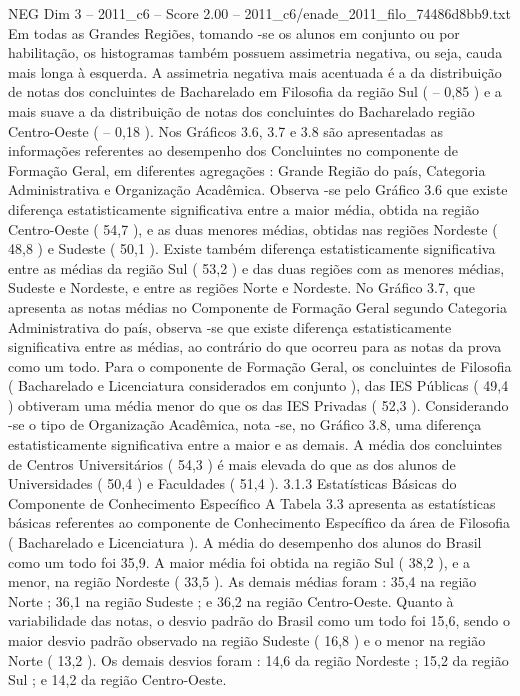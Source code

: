 \begin{textsample}{NEG Dim 3 – 2011\_c6 – Score 2.00 – 2011\_c6/enade\_2011\_filo\_74486d8bb9.txt}
Em todas as Grandes Regiões, tomando -se os alunos em conjunto ou por habilitação, os histogramas também possuem assimetria negativa, ou seja, cauda mais longa à esquerda.
A assimetria negativa mais acentuada é a da distribuição de notas dos concluintes de Bacharelado em Filosofia da região Sul ( – 0,85 ) e a mais suave a da distribuição de notas dos concluintes do Bacharelado região Centro-Oeste ( – 0,18 ).
Nos Gráficos 3.6, 3.7 e 3.8 são apresentadas as informações referentes ao desempenho dos Concluintes no componente de Formação Geral, em diferentes agregações : Grande Região do país, Categoria Administrativa e Organização Acadêmica.
Observa -se pelo Gráfico 3.6 que existe diferença estatisticamente significativa entre a maior média, obtida na região Centro-Oeste ( 54,7 ), e as duas menores médias, obtidas nas regiões Nordeste ( 48,8 ) e Sudeste ( 50,1 ).
Existe também diferença estatisticamente significativa entre as médias da região Sul ( 53,2 ) e das duas regiões com as menores médias, Sudeste e Nordeste, e entre as regiões Norte e Nordeste.
No Gráfico 3.7, que apresenta as notas médias no Componente de Formação Geral segundo Categoria Administrativa do país, observa -se que existe diferença estatisticamente significativa entre as médias, ao contrário do que ocorreu para as notas da prova como um todo.
Para o componente de Formação Geral, os concluintes de Filosofia ( Bacharelado e Licenciatura considerados em conjunto ), das IES Públicas ( 49,4 ) obtiveram uma média menor do que os das IES Privadas ( 52,3 ).
Considerando -se o tipo de Organização Acadêmica, nota -se, no Gráfico 3.8, uma diferença estatisticamente significativa entre a maior e as demais.
A média dos concluintes de Centros Universitários ( 54,3 ) é mais elevada do que as dos alunos de Universidades ( 50,4 ) e Faculdades ( 51,4 ). 3.1.3 Estatísticas Básicas do Componente de Conhecimento Específico A Tabela 3.3 apresenta as estatísticas básicas referentes ao componente de Conhecimento Específico da área de Filosofia ( Bacharelado e Licenciatura ).
A média do desempenho dos alunos do Brasil como um todo foi 35,9.
A maior média foi obtida na região Sul ( 38,2 ), e a menor, na região Nordeste ( 33,5 ).
As demais médias foram : 35,4 na região Norte ; 36,1 na região Sudeste ; e 36,2 na região Centro-Oeste.
Quanto à variabilidade das notas, o desvio padrão do Brasil como um todo foi 15,6, sendo o maior desvio padrão observado na região Sudeste ( 16,8 ) e o menor na região Norte ( 13,2 ).
Os demais desvios foram : 14,6 da região Nordeste ; 15,2 da região Sul ; e 14,2 da região Centro-Oeste.

\end{textsample}
